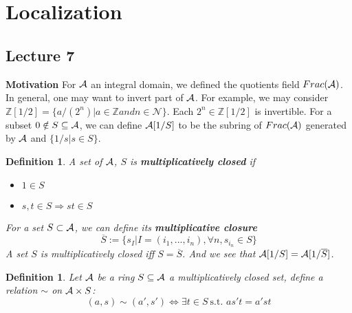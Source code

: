 \documentclass[11pt]{article}
\newtheorem{dfn}[thm]{Definition}
\newcommand{\intg}{\mathbb Z}
\newcommand{\cala}{{\cal A}}
\newcommand{\Lrta}{\Longrightarrow}
\begin{document}
\section{Localization}

\subsection{Lecture 7}
\textbf{Motivation}
For $\cala$ an integral domain, we defined the quotients field $Frac(\cala)$. In general, one may want to invert part of $\cala$. For example, we may consider $\intg[1/2]=\{a/(2^n)|a\in \intg and n\in \mathcal{N}\}$. Each $2^n\in \intg[1/2]$ is invertible. For a subset $0\notin S\subseteq \cala$, we can define $\cala[1/S]$ to be the subring of $Frac(\cala)$ generated by $\cala$ and $\{1/s|s\in S\}$.

\begin{dfn}
A set of $\cala$, $S$ is \textbf{multiplicatively closed} if 
\begin{itemize}
\item $1\in S$
\item $s,t\in S\Lrta st\in S$
\end{itemize}
For a set $S\subset \cala$, we can define its \textbf{multiplicative closure}
$$
\overline{S}:=\{s_{I}|I=(i_1,...,i_n), \forall{n},  s_{i_n}\in S\}
$$
A set $S$ is multiplicatively closed iff $S=\overline{S}$. And we see that $\cala[1/S]=\cala[1/\overline{S}]$.
\end{dfn}


\begin{dfn}
Let $\cala$ be a ring $S\subseteq \cala$ a multiplicatively closed set, define a relation $\sim $ on $\cala\times S$:
$$
(a,s)\sim(a',s')\Longleftrightarrow\exists t\in S \ \text{s.t. } as' t= a' st
$$
\end{dfn}
\end{document}

